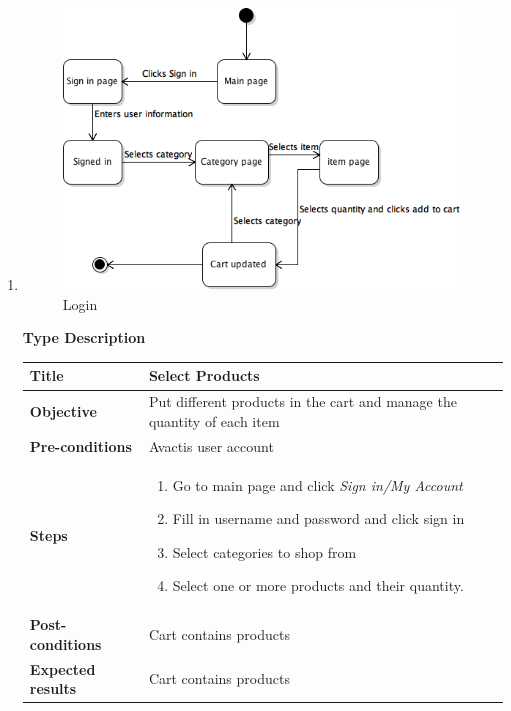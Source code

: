 \documentclass[UKenglish,12pt]{article}
\begin{document}
\begin{enumerate}
\item
\begin{figure}[!h]
\centering
\includegraphics[scale=0.7,keepaspectratio]{Images/SelectProducts.png}
\caption{Login}
\end{figure}
\newpage
\textbf{\hspace{0.3cm}Type\hspace{4.4cm} Description}
\newline \vspace{0.2cm}
\begin{tabular}{| p{5cm} | p{10cm} | }
	\hline
	 \textbf{Title} & Select Products \\ \hline
	 \textbf{Objective} & Put different products in the cart and manage the quantity of each item \\ \hline
	 \textbf{Pre-conditions} & Avactis user account \\ \hline
	 \textbf{Steps} & \begin{enumerate} \item Go to main page and click \textit{Sign in/My Account} \item Fill in username and password and click sign in \item Select categories to shop from \item Select one or more products and their quantity.
	 \end{enumerate} \\ \hline
	 \textbf{Post-conditions} & Cart contains products \\ \hline
	 \textbf{Expected results} & Cart contains products \\ 
	 \hline
\end{tabular} %



\end{enumerate}
\end{document}
